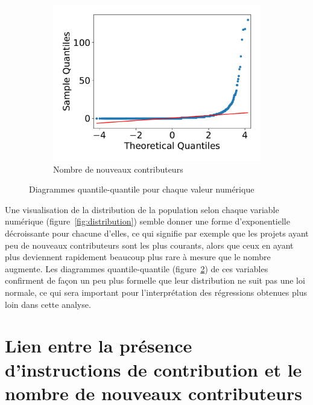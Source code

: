 \begin{figure}[ht]
\begin{subfigure}[t]{0.3\textwidth}
        \includegraphics[width=\textwidth]{experiment/data_analysis/newContributorCount_qqplot}
        \caption{Nombre de nouveaux contributeurs}
        \label{sfig:newContributorQQplot}
    \end{subfigure}

    \caption{Diagrammes quantile-quantile pour chaque valeur numérique}
    \label{fig:qqplots}
\end{figure}

Une visualisation de la distribution de la population selon chaque variable numérique
(figure~\ref{fig:distribution}) semble donner une forme d'exponentielle décroissante pour chacune d'elles, ce
qui signifie par exemple que les projets ayant peu de nouveaux contributeurs sont les plus courants, alors que
ceux en ayant plus deviennent rapidement beaucoup plus rare à mesure que le nombre augmente. Les diagrammes
quantile-quantile (figure~\ref{fig:qqplots}) de ces variables confirment de façon un peu plus formelle que
leur distribution ne suit pas une loi normale, ce qui sera important pour l'interprétation des régressions
obtenues plus loin dans cette analyse.

\section{Lien entre la présence d'instructions de contribution et le nombre de nouveaux contributeurs}

